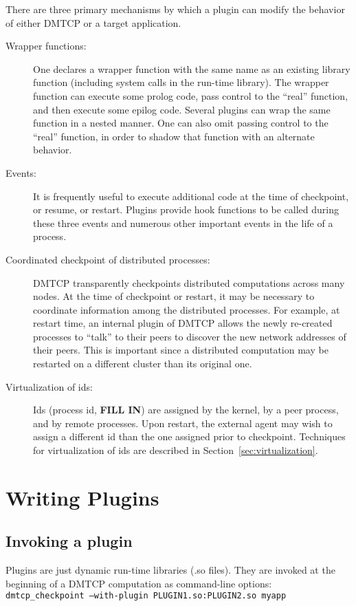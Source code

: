 \documentclass{article}
\begin{document}
There are three primary mechanisms by which a plugin can modify the
behavior of either DMTCP or a target application.
\begin{description}
\item[Wrapper functions:]  One declares a wrapper function with the same
	name as an existing library function (including system calls in
	the run-time library).  The wrapper function can execute some
	prolog code, pass control to the ``real'' function,
	and then execute some epilog code.  Several plugins can wrap
	the same function in a nested manner.  One can also omit
	passing control to the ``real'' function, in order to shadow
	that function with an alternate behavior.
\item[Events:]  It is frequently useful to execute additional code
	at the time of checkpoint, or resume, or restart.  Plugins
	provide hook functions	to be called during these three events
	and numerous other important events in the life of a process.
\item[Coordinated checkpoint of distributed processes:]  DMTCP transparently
	checkpoints distributed computations across many nodes.
	At the time of checkpoint or restart, it may be necessary to
	coordinate information among the distributed processes.  For example,
	at restart time, an internal plugin of DMTCP allows the newly
	re-created processes to ``talk'' to their peers to discover the
	new network addresses of their peers.  This is important since
	a distributed computation may be restarted on a different cluster
	than its original one.
\item[Virtualization of ids:]  Ids (process id, {\bf FILL IN}) are
        assigned by the kernel, by a peer process, and by remote processes.
	Upon restart, the external agent may wish to assign a different
	id than the one assigned prior to checkpoint.  Techniques for
	virtualization of ids are described in Section~\ref{sec:virtualization}.
\end{description}

\section{Writing Plugins}

\subsection{Invoking a plugin}

Plugins are just dynamic run-time libraries (.so files).  They are
invoked at the beginning of a DMTCP computation as command-line options:
\hfill\break
\medskip\noindent
  \hspace{0.3truein} {\tt dmtcp\_checkpoint --with-plugin PLUGIN1.so:PLUGIN2.so myapp}
\medskip
\end{document}
